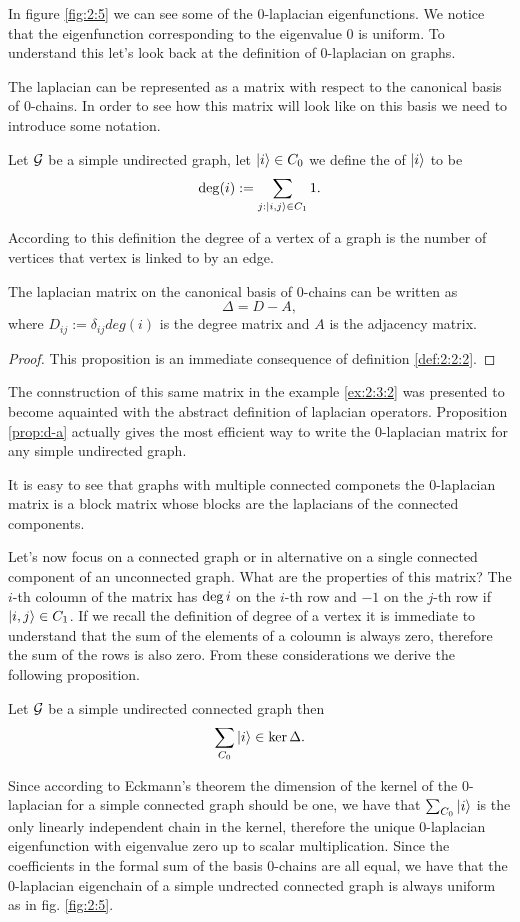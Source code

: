 \documentclass[../2.tex]{subfiles}
\begin{document}
In figure \ref{fig:2:5} we can see some of the $0$-laplacian eigenfunctions. We notice that the eigenfunction corresponding to the eigenvalue $0$ is uniform.
To understand this let's look back at the definition of $0$-laplacian on graphs. {\color{blue} The laplacian can be represented as a matrix with respect to the canonical basis
of $0$-chains. In order to see how this matrix will look like on this basis we need to introduce some notation.

\begin{defn}
    Let $\mathcal{G}$ be a simple undirected graph, let $| i \rangle \in C_0$ we define the  of $| i \rangle$ to be 
    \[ \operatorname{deg}(i) := \sum_{j : | i,j \rangle \in C_1} 1. \]
\end{defn}

According to this definition the degree of a vertex of a graph is the number of vertices that vertex is linked to by an edge.

\begin{prop}
    The laplacian matrix on the canonical basis of $0$-chains can be written as
    \[ \Delta = D - A, \]
    where $D_{ij} := \delta_{ij}deg(i)$ is the degree matrix and $A$ is the adjacency matrix.
    \label{prop:d-a}
\end{prop}
\begin{proof}
    This proposition is an immediate consequence of definition \ref{def:2:2:2}. \qedhere
\end{proof}

The connstruction of this same matrix in the example \ref{ex:2:3:2} was presented to become aquainted with the abstract definition of laplacian operators.
Proposition \ref{prop:d-a} actually gives the most efficient way to write the $0$-laplacian matrix for any simple undirected graph.

It is easy to see that graphs with multiple connected componets the $0$-laplacian matrix is a block matrix whose blocks are the laplacians of the connected components.

Let's now focus on a connected graph or in alternative on a single connected component of an unconnected graph. What are the properties of this matrix?
The $i$-th coloumn of the matrix has $\operatorname{deg}{i}$ on the $i$-th row and $-1$ on the $j$-th row if $| i,j \rangle \in C_1$. If we recall the definition of degree of a vertex
it is immediate to understand that the sum of the elements of a coloumn is always zero, therefore the sum of the rows is also zero. From these considerations
we derive the following proposition.

\begin{prop}
    Let $\mathcal{G}$ be a simple undirected connected graph then 
    \[ \sum_{C_0} | i \rangle \in \ker\Delta. \]
\end{prop}

Since according to Eckmann's theorem the dimension of the kernel of the $0$-laplacian for a simple connected graph should be one, 
we have that $\sum_{C_0} | i \rangle$ is the only linearly independent chain in the kernel, therefore the unique $0$-laplacian eigenfunction
with eigenvalue zero up to scalar multiplication. Since the coefficients in the formal sum of the basis $0$-chains are all equal, we have that the $0$-laplacian eigenchain
of a simple undrected connected graph is always uniform as in fig. \ref{fig:2:5}.
}
    
\end{document}
